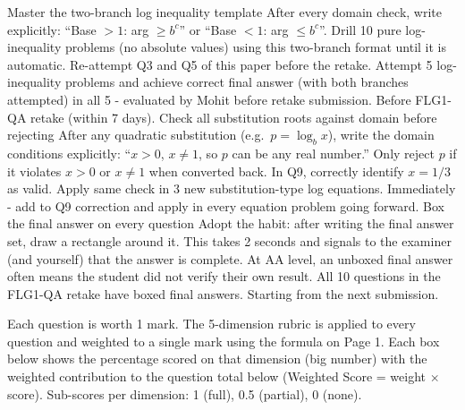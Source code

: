 \documentclass[11pt,a4paper]{article}
\begin{document}
\newpage
{}

\begin{tsImprovements}
        {Master the two-branch log inequality template}%
        {After every domain check, write explicitly: ``Base $>1$: arg $\geq b^c$'' or ``Base $<1$: arg $\leq b^c$''. Drill 10 pure log-inequality problems (no absolute values) using this two-branch format until it is automatic. Re-attempt Q3 and Q5 of this paper before the retake.}%
        {Attempt 5 log-inequality problems and achieve correct final answer (with both branches attempted) in all 5 - evaluated by Mohit before retake submission.}%
        {Before FLG1-QA retake (within 7 days).}
        {Check all substitution roots against domain before rejecting}%
        {After any quadratic substitution (e.g.\ $p = \log_{b} x$), write the domain conditions explicitly: ``$x>0$, $x\neq 1$, so $p$ can be any real number.'' Only reject $p$ if it violates $x>0$ or $x\neq 1$ when converted back.}%
        {In Q9, correctly identify $x = 1/3$ as valid. Apply same check in 3 new substitution-type log equations.}%
        {Immediately - add to Q9 correction and apply in every equation problem going forward.}
        {Box the final answer on every question}%
        {Adopt the habit: after writing the final answer set, draw a rectangle around it. This takes 2 seconds and signals to the examiner (and yourself) that the answer is complete. At AA level, an unboxed final answer often means the student did not verify their own result.}%
        {All 10 questions in the FLG1-QA retake have boxed final answers.}%
        {Starting from the next submission.}
\end{tsImprovements}


\newpage
{}

{\fontsize{9pt}{12pt}\selectfont\color{tsGrey} Each question is worth 1 mark. The 5-dimension rubric is applied to every question and weighted to a single mark using the formula on Page 1. Each box below shows the percentage scored on that dimension (big number) with the weighted contribution to the question total below (Weighted Score = weight $\times$ score). Sub-scores per dimension: 1 (full), 0.5 (partial), 0 (none).}
\end{document}
